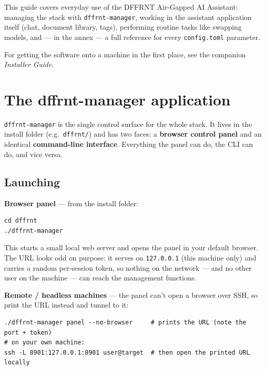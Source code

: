 \documentclass[11pt,letterpaper]{article}
\let\oldsection\section
\renewcommand{\section}{\vspace{1em}\oldsection}
\begin{document}
\setcounter{page}{1}
\pagestyle{fancy}

{\hypersetup{linkcolor=ink}\tableofcontents}
\clearpage

\setcounter{page}{1}

This guide covers everyday use of the DFFRNT Air-Gapped AI Assistant:
managing the stack with \texttt{dffrnt-manager}, working in the assistant
application itself (chat, document library, tags), performing routine tasks
like swapping models, and --- in the annex --- a full reference for every
\texttt{config.toml} parameter.

For getting the software onto a machine in the first place, see the companion
\emph{Installer Guide}.

\section{The dffrnt-manager application}

\texttt{dffrnt-manager} is the single control surface for the whole stack. It
lives in the install folder (e.g.\ \texttt{dffrnt/}) and has two faces: a
\textbf{browser control panel} and an identical \textbf{command-line
interface}. Everything the panel can do, the CLI can do, and vice versa.

\subsection{Launching}

\textbf{Browser panel} --- from the install folder:

\begin{lstlisting}
cd dffrnt
./dffrnt-manager
\end{lstlisting}

This starts a small local web server and opens the panel in your default
browser. The URL looks odd on purpose: it serves on \texttt{127.0.0.1} (this
machine only) and carries a random per-session token, so nothing on the
network --- and no other user on the machine --- can reach the management
functions.

\textbf{Remote / headless machines} --- the panel can't open a browser over
SSH, so print the URL instead and tunnel to it:

\begin{lstlisting}
./dffrnt-manager panel --no-browser     # prints the URL (note the port + token)
# on your own machine:
ssh -L 8901:127.0.0.1:8901 user@target  # then open the printed URL locally
\end{lstlisting}
\end{document}
